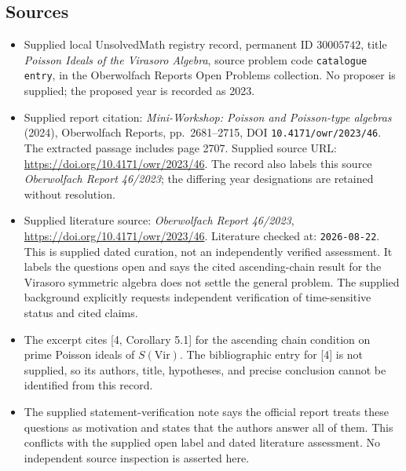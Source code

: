 \documentclass[11pt]{article}
\begin{document}
\subsection{Sources}
\begin{itemize}
\item Supplied local UnsolvedMath registry record, permanent ID \(30005742\), title \emph{Poisson Ideals of the Virasoro Algebra}, source problem code \texttt{catalogue entry}, in the Oberwolfach Reports Open Problems collection. No proposer is supplied; the proposed year is recorded as 2023.
\item Supplied report citation: \emph{Mini-Workshop: Poisson and Poisson-type algebras} (2024), Oberwolfach Reports, pp.\ 2681--2715, DOI \texttt{10.4171/owr/2023/46}. The extracted passage includes page 2707. Supplied source URL: \url{https://doi.org/10.4171/owr/2023/46}. The record also labels this source \emph{Oberwolfach Report 46/2023}; the differing year designations are retained without resolution.
\item Supplied literature source: \emph{Oberwolfach Report 46/2023}, \url{https://doi.org/10.4171/owr/2023/46}. Literature checked at: \texttt{2026-08-22}. This is supplied dated curation, not an independently verified assessment. It labels the questions open and says the cited ascending-chain result for the Virasoro symmetric algebra does not settle the general problem. The supplied background explicitly requests independent verification of time-sensitive status and cited claims.
\item The excerpt cites [4, Corollary 5.1] for the ascending chain condition on prime Poisson ideals of \(S(\mathrm{Vir})\). The bibliographic entry for [4] is not supplied, so its authors, title, hypotheses, and precise conclusion cannot be identified from this record.
\item The supplied statement-verification note says the official report treats these questions as motivation and states that the authors answer all of them. This conflicts with the supplied open label and dated literature assessment. No independent source inspection is asserted here.
\end{itemize}
\end{document}
